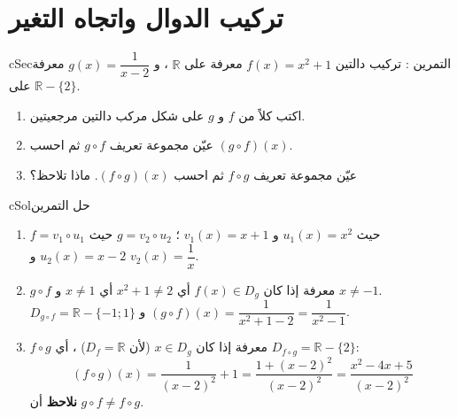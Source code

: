 \documentclass[12pt,a4paper]{article}
\newenvironment{BOX}[2]{\begin{otherlanguage}{english}\begin{arbox}{#1}{#2}}{\end{arbox}\end{otherlanguage}}
\newcounter{exo}
\newenvironment{tamrin}[1]{\stepcounter{exo}\begin{BOX}{cSec}{التمرين \theexo: #1}}{\end{BOX}}
\newenvironment{hal}{\Needspace{12\baselineskip}\begin{otherlanguage}{english}\begin{arbox}[breakable]{cSol}{حل التمرين \theexo}}{\end{arbox}\end{otherlanguage}}
\newcommand{\R}{\mathbb{R}}
\begin{document}
\section{تركيب الدوال واتجاه التغير}
\begin{tamrin}{تركيب دالتين}
$f(x)=x^2+1$ معرفة على $\R$ ، و $g(x)=\dfrac{1}{x-2}$ معرفة على $\R-\{2\}$.
\begin{enumerate}
\item اكتب كلاً من $f$ و $g$ على شكل مركب دالتين مرجعيتين.
\item عيّن مجموعة تعريف $g\circ f$ ثم احسب $(g\circ f)(x)$.
\item عيّن مجموعة تعريف $f\circ g$ ثم احسب $(f\circ g)(x)$. ماذا تلاحظ؟
\end{enumerate}
\end{tamrin}
\begin{hal}
\begin{enumerate}
\item $f=v_1\circ u_1$ حيث $u_1(x)=x^2$ و $v_1(x)=x+1$ ؛ \quad $g=v_2\circ u_2$ حيث $u_2(x)=x-2$ و $v_2(x)=\dfrac1x$.
\item $g\circ f$ معرفة إذا كان $f(x)\in D_g$ أي $x^2+1\ne2$ أي $x\ne1$ و $x\ne-1$.\\
$D_{g\circ f}=\R-\{-1;1\}$ \quad و \quad $(g\circ f)(x)=\dfrac{1}{x^2+1-2}=\boxed{\dfrac{1}{x^2-1}}$.
\item $f\circ g$ معرفة إذا كان $x\in D_g$ (لأن $D_f=\R$) ، أي $D_{f\circ g}=\R-\{2\}$:
\[(f\circ g)(x)=\frac{1}{(x-2)^2}+1=\frac{1+(x-2)^2}{(x-2)^2}=\boxed{\frac{x^2-4x+5}{(x-2)^2}}\]
\textbf{نلاحظ} أن $g\circ f\ne f\circ g$.
\end{enumerate}
\end{hal}
\end{document}
